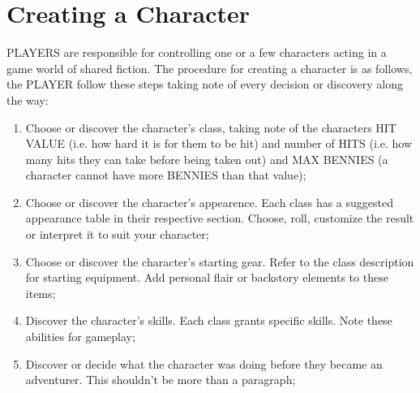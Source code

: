 \section{Creating a Character}
PLAYERS are responsible for controlling one or a few characters acting in a game world of shared fiction. The procedure for creating a character is as follows, the PLAYER follow these steps taking note of every decision or discovery along the way:
\begin{enumerate}
  \item {Choose or discover the character's class, taking note of the characters HIT VALUE (i.e. how hard it is for them to be hit) and number of HITS (i.e. how many hits they can take before being taken out) and MAX BENNIES (a character cannot have more BENNIES than that value);}
  \item {Choose or discover the character's appearence. Each class has a suggested appearance table in their respective section. Choose, roll, customize the result or interpret it to suit your character;}
  \item {Choose or discover the character's starting gear. Refer to the class description for starting equipment. Add personal flair or backstory elements to these items;}
  \item {Discover the character's skills. Each class grants specific skills. Note these abilities for gameplay;}
  \item {Discover or decide what the character was doing before they became an adventurer. This shouldn't be more than a paragraph;}
\end{enumerate}
